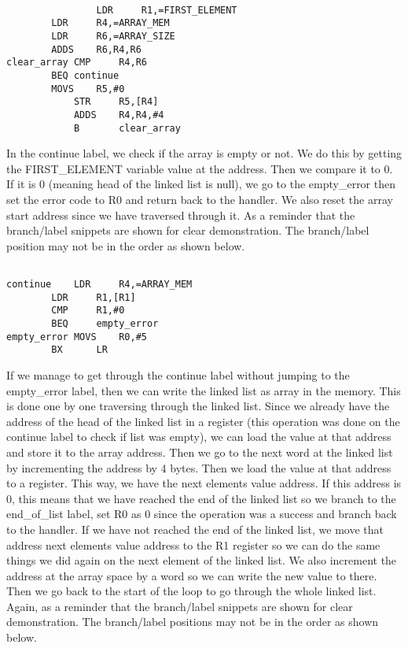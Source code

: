 \documentclass[pdftex,12pt,a4paper]{article}
\begin{document}
\begin{lstlisting}

                LDR     R1,=FIRST_ELEMENT			
		LDR     R4,=ARRAY_MEM			
		LDR     R6,=ARRAY_SIZE				
		ADDS    R6,R4,R6					
clear_array	CMP     R4,R6					
		BEQ	continue				
		MOVS    R5,#0					
        	STR     R5,[R4]					
        	ADDS    R4,R4,#4					
        	B       clear_array	
\end{lstlisting}

In the continue label, we check if the array is empty or not. We do this by getting the FIRST\_ELEMENT variable value at the address. Then we compare it to 0. If it is 0 (meaning head of the linked list is null), we go to the empty\_error then set the error code to R0 and return back to the handler. We also reset the array start address since we have traversed through it. As a reminder that the branch/label snippets are shown for clear demonstration. The branch/label position may not be in the order as shown below.

\begin{lstlisting}

continue	LDR     R4,=ARRAY_MEM			
		LDR     R1,[R1]					
		CMP     R1,#0					
		BEQ     empty_error				
empty_error	MOVS    R0,#5					
		BX      LR					
\end{lstlisting}

If we manage to get through the continue label without jumping to the empty\_error label, then we can write the linked list as array in the memory. This is done one by one traversing through the linked list. Since we already have the address of the head of the linked list in a register (this operation was done on the continue label to check if list was empty), we can load the value at that address and store it to the array address. Then we go to the next word at the linked list by incrementing the address by 4 bytes. Then we load the value at that address to a register. This way, we have the next elements value address. If this address is 0, this means that we have reached the end of the linked list so we branch to the end\_of\_list label, set R0 as 0 since the operation was a success and branch back to the handler. If we have not reached the end of the linked list, we move that address next elements value address to the R1 register so we can do the same things we did again on the next element of the linked list. We also increment the address at the array space by a word so we can write the new value to there. Then we go back to the start of the loop to go through the whole linked list. Again, as a reminder that the branch/label snippets are shown for clear demonstration. The branch/label positions may not be in the order as shown below.
\end{document}
